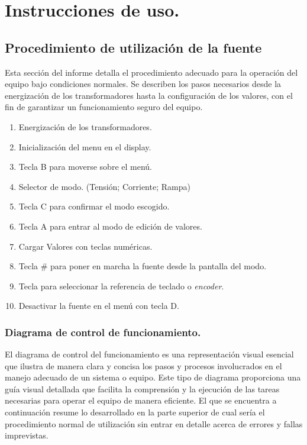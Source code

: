\chapter{Instrucciones de uso.}

\label{C:Forma de operar la fuente DC}

\section{Procedimiento de utilización de la fuente}

Esta sección del informe detalla el procedimiento adecuado para la operación del equipo bajo condiciones normales. Se describen los pasos necesarios desde la energización de los transformadores hasta la configuración de los valores, con el fin de garantizar un funcionamiento seguro del equipo.\par 

\begin{enumerate}
    \item Energización de los transformadores.
    \item Inicialización del menu en el display.
    \item Tecla B para moverse sobre el menú.
    \item Selector de modo. (Tensión; Corriente; Rampa)
    \item Tecla C para confirmar el modo escogido.
    \item Tecla A para entrar al modo de edición de valores.
    \item Cargar Valores con teclas numéricas.
    \item Tecla \# para poner en marcha la fuente desde la pantalla del modo.
    \item Tecla \* para seleccionar la referencia de teclado o \textit{encoder}.
    \item Desactivar la fuente en el menú con tecla D.
\end{enumerate}

\subsection{Diagrama de control de funcionamiento.}

El diagrama de control del funcionamiento es una representación visual esencial que ilustra de manera clara y concisa los pasos y procesos involucrados en el manejo adecuado de un sistema o equipo. Este tipo de diagrama proporciona una guía visual detallada que facilita la comprensión y la ejecución de las tareas necesarias para operar el equipo de manera eficiente. El que se encuentra a continuación resume lo desarrollado en la parte superior de cual sería el procedimiento normal de utilización sin entrar en detalle acerca de errores y fallas imprevistas. 

